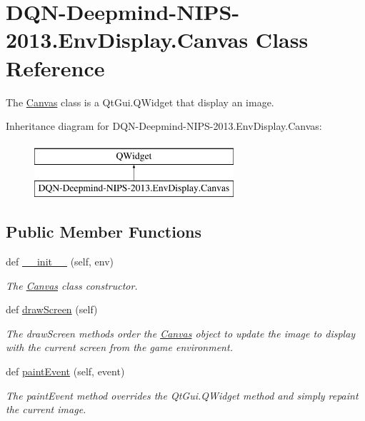 \hypertarget{classDQN-Deepmind-NIPS-2013_1_1EnvDisplay_1_1Canvas}{}\section{D\+Q\+N-\/\+Deepmind-\/\+N\+I\+P\+S-\/2013.Env\+Display.\+Canvas Class Reference}
\label{classDQN-Deepmind-NIPS-2013_1_1EnvDisplay_1_1Canvas}


The \hyperlink{classDQN-Deepmind-NIPS-2013_1_1EnvDisplay_1_1Canvas}{Canvas} class is a Qt\+Gui.\+Q\+Widget that display an image.  


Inheritance diagram for D\+Q\+N-\/\+Deepmind-\/\+N\+I\+P\+S-\/2013.Env\+Display.\+Canvas\+:\begin{figure}[H]
\begin{center}
\leavevmode
\includegraphics[height=2.000000cm]{classDQN-Deepmind-NIPS-2013_1_1EnvDisplay_1_1Canvas}
\end{center}
\end{figure}
\subsection*{Public Member Functions}
\begin{DoxyCompactItemize}
\item 
def \hyperlink{classDQN-Deepmind-NIPS-2013_1_1EnvDisplay_1_1Canvas_ae4988f04f58e179d82925dd7b6157ee7}{\+\_\+\+\_\+init\+\_\+\+\_\+} (self, env)
\begin{DoxyCompactList}\small\item\em The \hyperlink{classDQN-Deepmind-NIPS-2013_1_1EnvDisplay_1_1Canvas}{Canvas} class constructor. \end{DoxyCompactList}\item 
def \hyperlink{classDQN-Deepmind-NIPS-2013_1_1EnvDisplay_1_1Canvas_a6225ff0fed4f12c11640877f04286c91}{draw\+Screen} (self)
\begin{DoxyCompactList}\small\item\em The draw\+Screen methods order the \hyperlink{classDQN-Deepmind-NIPS-2013_1_1EnvDisplay_1_1Canvas}{Canvas} object to update the image to display with the current screen from the game environment. \end{DoxyCompactList}\item 
def \hyperlink{classDQN-Deepmind-NIPS-2013_1_1EnvDisplay_1_1Canvas_a7bb5fe211a49f4ead25e6ebdb02f32af}{paint\+Event} (self, event)
\begin{DoxyCompactList}\small\item\em The paint\+Event method overrides the Qt\+Gui.\+Q\+Widget method and simply repaint the current image. \end{DoxyCompactList}\end{DoxyCompactItemize}


